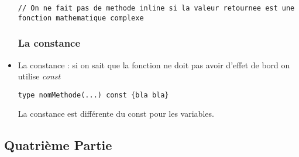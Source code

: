 \documentclass[12pt,a4paper]{article}
\begin{document}
\begin{itemize}
\begin{lstlisting}
// On ne fait pas de methode inline si la valeur retournee est une fonction mathematique complexe
\end{lstlisting}
\subsubsection{La constance}
\item La constance : si on sait que la fonction ne doit pas avoir d'effet de bord on utilise \textit{const}
\begin{lstlisting}
type nomMethode(...) const {bla bla}
\end{lstlisting}
La constance est différente du const pour les variables.
\end{itemize}

\subsection{Quatrième Partie}
\end{document}
